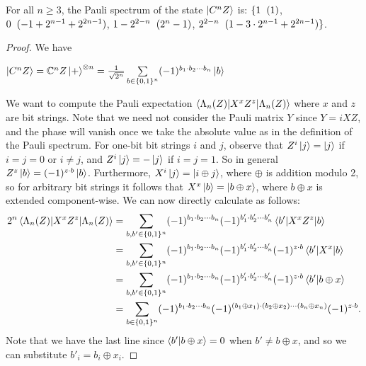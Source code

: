 \documentclass[12pt]{dalthesis}
\begin{document}
\begin{proposition}
\label{prop4.2}
For all $n \geq 3$, the Pauli spectrum of the state $\ket{C^n Z}$ is: $\{ 1 \hspace{2mm} (1)$, $0 \hspace{2mm} (-1 +2^{n-1} + 2^{2n-1})$, $1-2^{2-n} \hspace{2mm} (2^n-1)$, $2^{2-n}  \hspace{2mm} (1-3 \cdot 2^{n-1} + 2^{2n-1}) \}$.
\end{proposition}

\begin{proof}
We have 
\begin{center}
$\ket{C^n Z} = \mathbb{C}^n Z \ket{+}^{\otimes n} = \frac{1}{\sqrt{2^n}} \sum\limits_{b \in \{0, 1\}^n} (-1)^{b_1 \cdot b_2 \cdots b_n} \ket{b}$
\end{center}
We want to compute the Pauli expectation $\braket{\Lambda_n (Z)|X^xZ^z|\Lambda_n (Z)}$ where $x$ and $z$ are bit strings. Note that we need not consider the Pauli matrix $Y$ since $Y = iXZ$, and the phase will vanish once we take the absolute value as in the definition of the Pauli spectrum. For one-bit bit strings $i$ and $j$, observe that $Z^i \ket{j} = \ket{j}$ if $i=j=0$ or $i \neq j$, and $Z^i \ket{j} = -\ket{j}$ if $i=j=1$. So in general $Z^z \ket{b} = (-1)^{z \cdot b}\ket{b}$. Furthermore, $X^i \ket{j} = \ket{i \oplus j}$, where $\oplus$ is addition modulo 2, so for arbitrary bit strings it follows that $X^x\ket{b} = \ket{b \oplus x}$, where $b \oplus x$ is extended component-wise. We can now directly calculate as follows:
\begin{equation*}
\begin{split}
2^n\braket{\Lambda_n (Z)|X^xZ^z|\Lambda_n (Z)} & = \sum\limits_{b, b' \in \{0, 1\}^n} (-1)^{b_1 \cdot b_2 \cdots b_n} (-1)^{b'_1 \cdot b'_2 \cdots b'_n} \braket{b'|X^xZ^z|b} \\
& = \sum\limits_{b, b' \in \{0, 1\}^n} (-1)^{b_1 \cdot b_2 \cdots b_n} (-1)^{b'_1 \cdot b'_2 \cdots b'_n} (-1)^{z \cdot b} \braket{b'|X^x|b} \\
& = \sum\limits_{b, b' \in \{0, 1\}^n} (-1)^{b_1 \cdot b_2 \cdots b_n} (-1)^{b'_1 \cdot b'_2 \cdots b'_n} (-1)^{z \cdot b} \braket{b'|b \oplus x} \\
& = \sum\limits_{b \in \{0, 1\}^n} (-1)^{b_1 \cdot b_2 \cdots b_n} (-1)^{(b_1 \oplus x_1) \cdot (b_2 \oplus x_2) \cdots (b_n \oplus x_n)} (-1)^{z \cdot b}.
\end{split}
\end{equation*}
Note that we have the last line since $\braket{b'|b \oplus x} = 0$ when $b' \neq b \oplus x$, and so we can substitute $b'_i = b_i \oplus x_i$. 


\end{proof}
\end{document}
